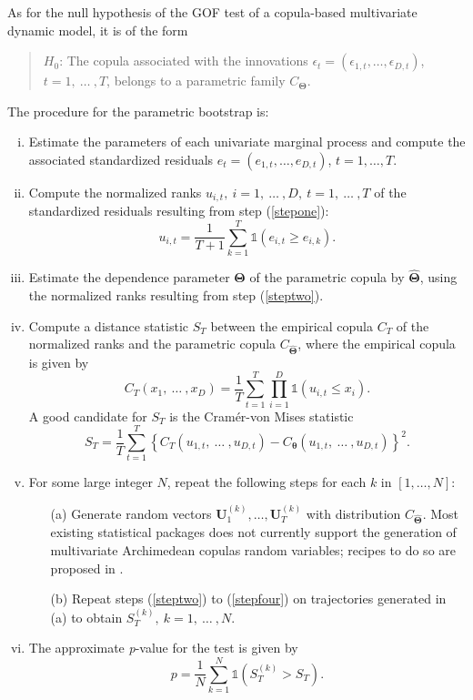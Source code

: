As for the null hypothesis of the GOF test of a copula-based
multivariate dynamic model, it is of the form
\begin{quote}
$H_0$: The  copula associated with the innovations $ \epsilon_{t} =
(\epsilon_{1,t},\ldots,\epsilon_{D,t})$, $t=1, \ \ldots \ , T$,
 belongs to a parametric  family $C{_\mathbf{\Theta}}$.
\end{quote}
The procedure for the parametric bootstrap is:
\begin{enumerate}[(i)]
\item \label{stepone} Estimate the parameters of each univariate marginal process and compute the associated standardized residuals $e_t=(e_{1,t},\ldots, e_{D,t})$, $t=1,\ldots,T$.
\item \label{steptwo} Compute the normalized ranks $u_{i,t}, \ i=1, \ \ldots \ , D, \ t=1, \ \ldots \ , T$ of the standardized residuals resulting from step (\ref{stepone}):
\begin{displaymath}
u_{i,t}=\frac{1}{T+1} \sum_{k=1}^T \mathds{1}(e_{i,t}\geq e_{i,k}).
\end{displaymath}
\item \label{stepthree} Estimate the dependence parameter $\mathbf{\Theta}$ of the parametric copula by $\hat{\mathbf{\Theta}}$, using the normalized ranks resulting from step (\ref{steptwo}).
\item \label{stepfour} Compute a distance statistic $S_T$ between the empirical copula $C_T$
of the normalized ranks and the parametric copula
$C_{\hat{\mathbf{\Theta}}}$, where the empirical copula is given by
\begin{displaymath}
C_T(x_1, \ \ldots \ , x_D)=\frac{1}{T} \sum_{t=1}^T \prod_{i=1}^D
\mathds{1}(u_{i,t} \leq x_{i}).
\end{displaymath}
A good candidate for $S_T$ is the Cram\'er-von Mises statistic
\begin{displaymath}
S_T=\frac{1}{T} \sum_{t=1}^T \left\{C_T(u_{1,t}, \ \ldots \ ,
u_{D,t})-C_{\mathbf{\theta}}(u_{1,t}, \ \ldots \ ,
u_{D,t})\right\}^2.
\end{displaymath}
\item For some large integer $N$, repeat the following steps for each $k$ in $[1,\ldots,N]$:
\begin{enumerate}[(i)]
\item[(a)] \label{a} Generate random vectors $\mathbf{U}_1^{(k)},\ldots, \mathbf{U}_T^{(k)}$ with distribution $C_{\hat{\mathbf{\Theta}}}$.
Most existing statistical packages does not currently support the
generation of multivariate Archimedean copulas random variables;
recipes to do so are proposed in \cite{marshallolkin88}.
\item[(b)] Repeat steps (\ref{steptwo}) to (\ref{stepfour}) on
trajectories generated in (a) to obtain $S_T^{(k)}, \ k=1, \ \ldots \ , N$.
\end{enumerate}
\item The approximate \emph{p}-value for the test is given by
\begin{displaymath}
p=\frac{1}{N} \sum_{k=1}^N \mathds{1}\left(S_T^{(k)}>S_T\right).
\end{displaymath}
\end{enumerate}

